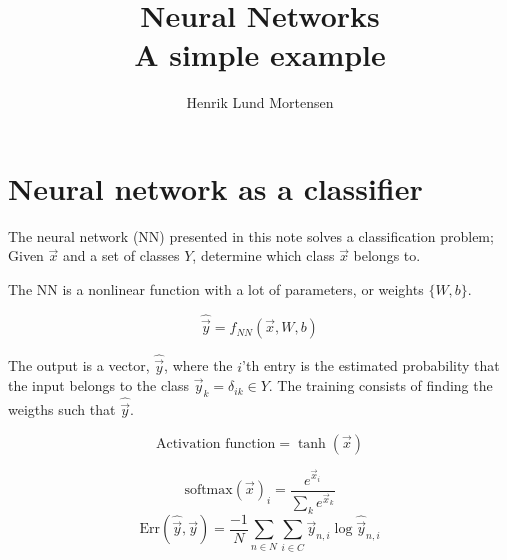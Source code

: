 \documentclass[oneside]{memoir}
\title{Neural Networks \\ \small{A simple example}}
\author{Henrik Lund Mortensen}
\newcommand{\yhat}{\ensuremath{\hat{\vec{y}}}}
\begin{document}
\maketitle

\section{Neural network as a classifier}
The neural network (NN) presented in this note solves a classification problem; Given $\vec{x}$ and a set of classes $Y$, determine which class $\vec{x}$ belongs to. 

The NN is a nonlinear function with a lot of parameters, or weights $\{W,b\}$.

\begin{equation}
  \label{NN}
  \yhat{} = f_{NN}(\vec{x},W,b)
\end{equation}

The output is a vector, $\hat{\vec{y}}$, where the $i$'th entry is the estimated probability that the input belongs to the class $\vec{y}_{k} = \delta_{ik} \in Y$. The training consists of finding the weigths such that $\yhat{}$. 





\begin{equation}
  \label{activation function tanh}
\text{Activation function} = \tanh(\vec{x})
\end{equation}

\begin{equation}
  \label{softmax}
  \text{softmax}(\vec{x})_i = \frac{e^{\vec{x}_i}}{\sum_k e^{\vec{x}_k}}
\end{equation}
\begin{equation}
  \label{cross entropy}
  \text{Err}(\hat{\vec{y}},\vec{y}) = \frac{-1}{N} \sum_{n\in N} \sum_{i \in C} \vec{y}_{n,i} \log \hat{\vec{y}}_{n,i}
\end{equation}
\end{document}
